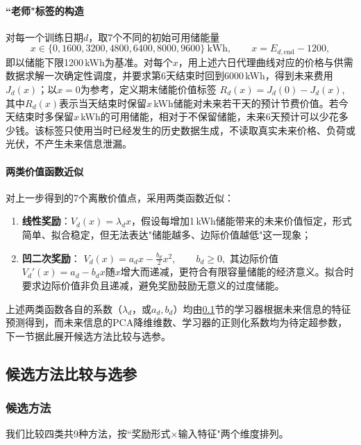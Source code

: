 \paragraph{``老师"标签的构造}
对每一个训练日期$d$，取7个不同的初始可用储能量
$$
x\in\{0,1600,3200,4800,6400,8000,9600\}\ \mathrm{kWh},\qquad x=E_{d,\mathrm{end}}-1200,
$$
即以储能下限1200\,kWh为基准。对每个$x$，用上述六日代理曲线对应的价格与供需数据求解一次确定性调度，并要求第6天结束时回到6000\,kWh，得到未来费用$J_d(x)$；以$x=0$为参考，定义期末储能价值标签
$R_d(x)=J_d(0)-J_d(x)$,
其中$R_d(x)$表示当天结束时保留$x$\,kWh储能对未来若干天的预计节费价值。若今天结束时多保留$x$\,kWh的可用储能，相对于不保留储能，未来6天预计可以少花多少钱。该标签只使用当时已经发生的历史数据生成，不读取真实未来价格、负荷或光伏，不产生未来信息泄漏。

\paragraph{两类价值函数近似}
对上一步得到的7个离散价值点，采用两类函数近似：

\begin{enumerate}
  \item \textbf{线性奖励}：$V_d(x)=\lambda_dx$，假设每增加1\,kWh储能带来的未来价值恒定，形式简单、拟合稳定，但无法表达"储能越多、边际价值越低"这一现象；
  \item \textbf{凹二次奖励}：
$V_d(x)=a_dx-\frac{b_d}{2}x^2,\qquad b_d\ge0,$
  其边际价值$V_d'(x)=a_d-b_dx$随$x$增大而递减，更符合有限容量储能的经济意义。拟合时要求边际价值非负且递减，避免奖励鼓励无意义的过度储能。
\end{enumerate}

上述两类函数各自的系数（$\lambda_d$，或$a_d,b_d$）均由\ref{sec:q4-comparison}节的学习器根据未来信息的特征预测得到，而未来信息的PCA降维维数、学习器的正则化系数均为待定超参数，下一节据此展开候选方法比较与选参。

\subsection{候选方法比较与选参}
\label{sec:q4-comparison}
\subsubsection{候选方法}
我们比较四类共9种方法，按``奖励形式$\times$输入特征"两个维度排列。

